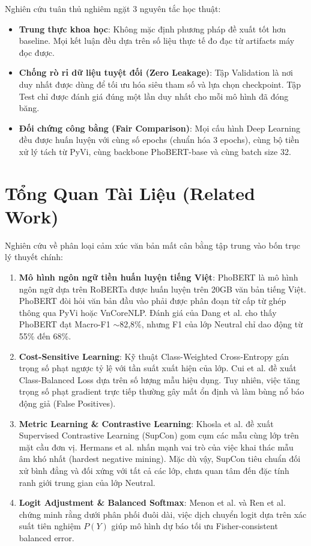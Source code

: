 \documentclass[10pt,journal,compsoc]{IEEEtran}
\begin{document}
Nghiên cứu tuân thủ nghiêm ngặt 3 nguyên tắc học thuật:
\begin{itemize}
    \item \textbf{Trung thực khoa học}: Không mặc định phương pháp đề xuất tốt hơn baseline. Mọi kết luận đều dựa trên số liệu thực tế đo đạc từ artifacts máy đọc được.
    \item \textbf{Chống rò rỉ dữ liệu tuyệt đối (Zero Leakage)}: Tập Validation là nơi duy nhất được dùng để tối ưu hóa siêu tham số và lựa chọn checkpoint. Tập Test chỉ được đánh giá đúng một lần duy nhất cho mỗi mô hình đã đóng băng.
    \item \textbf{Đối chứng công bằng (Fair Comparison)}: Mọi cấu hình Deep Learning đều được huấn luyện với cùng số epochs (chuẩn hóa 3 epochs), cùng bộ tiền xử lý tách từ PyVi, cùng backbone PhoBERT-base và cùng batch size 32.
\end{itemize}

\section{Tổng Quan Tài Liệu (Related Work)}
Nghiên cứu về phân loại cảm xúc văn bản mất cân bằng tập trung vào bốn trục lý thuyết chính:
\begin{enumerate}
    \item \textbf{Mô hình ngôn ngữ tiền huấn luyện tiếng Việt}: PhoBERT \cite{nguyen2020phobert} là mô hình ngôn ngữ dựa trên RoBERTa được huấn luyện trên 20GB văn bản tiếng Việt. PhoBERT đòi hỏi văn bản đầu vào phải được phân đoạn từ cấp từ ghép thông qua PyVi hoặc VnCoreNLP. Đánh giá của Dang et al. \cite{dang2023vietnamese} cho thấy PhoBERT đạt Macro-F1 $\sim$82,8\%, nhưng F1 của lớp Neutral chỉ dao động từ 55\% đến 68\%.
    \item \textbf{Cost-Sensitive Learning}: Kỹ thuật Class-Weighted Cross-Entropy gán trọng số phạt ngược tỷ lệ với tần suất xuất hiện của lớp. Cui et al. \cite{cui2019class} đề xuất Class-Balanced Loss dựa trên số lượng mẫu hiệu dụng. Tuy nhiên, việc tăng trọng số phạt gradient trực tiếp thường gây mất ổn định và làm bùng nổ báo động giả (False Positives).
    \item \textbf{Metric Learning \& Contrastive Learning}: Khosla et al. \cite{khosla2020supervised} đề xuất Supervised Contrastive Learning (SupCon) gom cụm các mẫu cùng lớp trên mặt cầu đơn vị. Hermans et al. \cite{hermans2017defense} nhấn mạnh vai trò của việc khai thác mẫu âm khó nhất (hardest negative mining). Mặc dù vậy, SupCon tiêu chuẩn đối xử bình đẳng và đối xứng với tất cả các lớp, chưa quan tâm đến đặc tính ranh giới trung gian của lớp Neutral.
    \item \textbf{Logit Adjustment \& Balanced Softmax}: Menon et al. \cite{menon2021long} và Ren et al. \cite{ren2020balanced} chứng minh rằng dưới phân phối đuôi dài, việc dịch chuyển logit dựa trên xác suất tiên nghiệm $P(Y)$ giúp mô hình dự báo tối ưu Fisher-consistent balanced error.
\end{enumerate}
\end{document}
